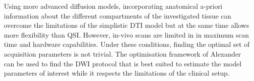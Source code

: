 Using more advanced diffusion models, incorporating anatomical a-priori information about the different compartments of the investigated tissue can overcome the limitations of the simplistic \gls{DTI} model but at the same time allows more flexibility than \gls{QSI}. However, in-vivo scans are limited in in maximum scan time and hardware capabilities. Under these conditions, finding the optimal set of acquisition parameters is not trivial. The optimisation framework of Alexander can be used to find the  {\gls{DWI}}  protocol that is best suited to estimate the model parameters of interest while it respects the limitations of the clinical setup.  
